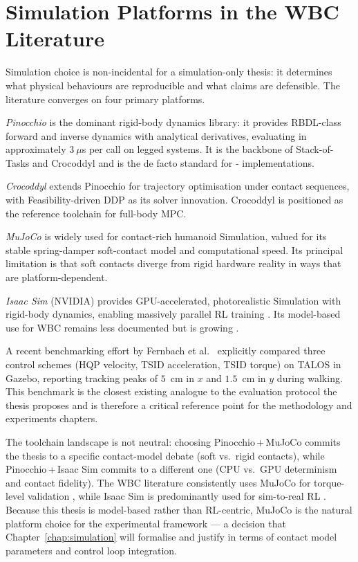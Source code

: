 \section{Simulation Platforms in the WBC Literature}
\label{sec:sota_sim}

Simulation choice is non-incidental for a simulation-only thesis: it
determines what physical behaviours are reproducible and what claims are
defensible. The literature converges on four primary platforms.

\emph{Pinocchio} \cite{Pinocchio} is the dominant rigid-body dynamics
library: it provides RBDL-class forward and inverse dynamics with
analytical derivatives, evaluating in approximately $3~\mu$s per call on
legged systems. It is the backbone of Stack-of-Tasks and Crocoddyl
\cite{Crocoddyl} and is the de facto standard for \QP-\WBC{}
implementations.

\emph{Crocoddyl} \cite{Crocoddyl} extends Pinocchio for trajectory
optimisation under contact sequences, with Feasibility-driven DDP as its
solver innovation. Crocoddyl is positioned as the reference toolchain
for full-body MPC.

\emph{MuJoCo} \cite{MuJoCo2012} is widely used for contact-rich humanoid
Simulation, valued for its stable spring-damper soft-contact model and
computational speed. Its principal limitation is that soft contacts
diverge from rigid hardware reality in ways that are platform-dependent.

\emph{Isaac Sim} (NVIDIA) provides GPU-accelerated, photorealistic
Simulation with rigid-body dynamics, enabling massively parallel RL
training \cite{HumanoidGym2024}. Its model-based use for WBC remains
less documented but is growing \cite{PolySim2025}.

A recent benchmarking effort by Fernbach et al.\ \cite{Fernbach2018}
explicitly compared three control schemes (HQP velocity, TSID
acceleration, TSID torque) on TALOS in Gazebo, reporting \com{} tracking
peaks of $5$~cm in $x$ and $1.5$~cm in $y$ during walking. This benchmark
is the closest existing analogue to the evaluation protocol the thesis
proposes and is therefore a critical reference point for the methodology
and experiments chapters.

\begin{criticalinsight}
The toolchain landscape is not neutral: choosing Pinocchio\,+\,MuJoCo
commits the thesis to a specific contact-model debate (soft vs.\ rigid
contacts), while Pinocchio\,+\,Isaac Sim commits to a different one (CPU
vs.\ GPU determinism and contact fidelity). The WBC literature
consistently uses MuJoCo for torque-level validation \cite{DelPrete2016,MuJoCo2012},
while Isaac Sim is predominantly used for sim-to-real RL
\cite{HumanoidGym2024}. Because this thesis is model-based rather than
RL-centric, MuJoCo is the natural platform choice for the experimental
framework --- a decision that Chapter~\ref{chap:simulation} will
formalise and justify in terms of contact model parameters and control
loop integration.
\end{criticalinsight}


